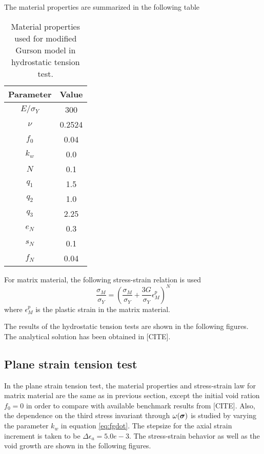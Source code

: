 The material properties are summarized in the following table

\begin{table}[H]
  \begin{center}
    \begin{tabular}{ c c}
      \toprule
      Parameter	  &	  Value	  \\
	  \midrule
	  $E/\sigma_Y$ 			  & 300 	 \\
	  $\nu$			  & 0.2524  \\
	  $f_0$     	  & 0.04 \\
	  $k_w$           & 0.0 \\
	  $N$             & 0.1 \\
	  $q_1$          & 1.5 \\
	  $q_2$          & 1.0 \\
	  $q_3$          & 2.25 \\
	  $e_N$	      & 0.3\\
	  $s_N$          & 0.1\\
	  $f_N$			  & 0.04\\     
      \bottomrule
    \end{tabular}
    \caption{Material properties used for modified Gurson model in
      hydrostatic tension test.}
    \label{tab:matl_hydrostatic}
  \end{center}
\end{table}
For matrix material, the following stress-strain relation is used
\begin{equation}
  \frac{\sigma_M}{\sigma_Y} = \left( \frac{\sigma_M}{\sigma_Y} +
  \frac{3G}{\sigma_Y}\epsilon_M^p\right)^N
\end{equation}
where $\epsilon_M^p$ is the plastic strain in the matrix material.

The results of the hydrostatic tension tests are shown in the
following figures. The analytical solution has been obtained in
[CITE].

\subsection{Plane strain tension test}
In the plane strain tension test, the material properties and
stress-strain law for matrix material are the same as in previous
section, except the initial void ration $f_0 = 0$ in order to compare
with available benchmark results from [CITE]. Also, the dependence on
the third stress invariant through $\omega({\boldsymbol{\sigma}})$ is studied
by varying the parameter $k_w$ in equation \eqref{eq:fgdot}. The
stepsize for the axial strain increment is taken to be
$\Delta\epsilon_a = 5.0e-3$. The stress-strain behavior as well as the
void growth are shown in the following figures.

